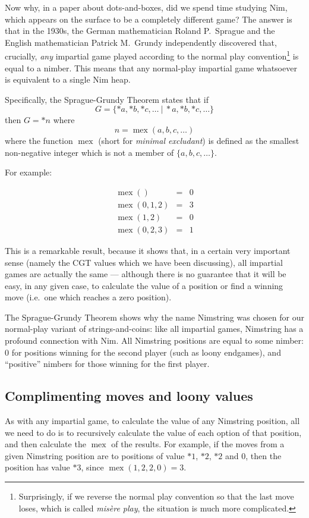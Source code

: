 \documentclass[a4paper,twocolumn]{article}
\DeclareMathOperator{\mex}{mex}
\newcommand{\cgtgame}[2]{\{#1 \:|\: #2\}}
\begin{document}
Now why, in a paper about dots-and-boxes, did we spend time studying
Nim, which appears on the surface to be a completely different game?
The answer is that in the 1930s, the German mathematician Roland
P.\ Sprague and the English mathematician Patrick M.\ Grundy
independently discovered that, crucially, \emph{any} impartial game
played according to the normal play convention\footnote{Surprisingly,
  if we reverse the normal play convention so that the last move
  loses, which is called \emph{mis\`ere play}, the situation is much
  more complicated.} is equal to a nimber. This means that any
normal-play impartial game whatsoever is equivalent to a single Nim
heap.

Specifically, the Sprague-Grundy Theorem states that if $$G =
\cgtgame{*a, *b, *c, \ldots}{*a, *b, *c, \ldots}$$ then $G = *n$
where $$n = \mex(a, b, c, \ldots)$$ where the function $\mex$ (short
for \emph{minimal excludant}) is defined as the smallest non-negative
integer which is not a member of $\{a, b, c, \ldots\}$.

For example:

\begin{eqnarray*}
  \mex() & = & 0 \\
  \mex(0, 1, 2) & = & 3 \\
  \mex(1, 2) & = & 0 \\
  \mex(0, 2, 3) & = & 1
\end{eqnarray*}

This is a remarkable result, because it shows that, in a certain very
important sense (namely the CGT values which we have been discussing),
all impartial games are actually the same --- although there is no
guarantee that it will be easy, in any given case, to calculate the
value of a position or find a winning move (i.e.\ one which reaches a
zero position).

The Sprague-Grundy Theorem shows why the name Nimstring was chosen for
our normal-play variant of strings-and-coins: like all impartial
games, Nimstring has a profound connection with Nim. All Nimstring
positions are equal to some nimber: $0$ for positions winning for the
second player (such as loony endgames), and ``positive'' nimbers for
those winning for the first player.

\subsection{Complimenting moves and loony values}

As with any impartial game, to calculate the value of any Nimstring
position, all we need to do is to recursively calculate the value of
each option of that position, and then calculate the $\mex$ of the
results. For example, if the moves from a given Nimstring position are
to positions of value $*1$, $*2$, $*2$ and $0$, then the position has
value $*3$, since $\mex(1, 2, 2, 0) = 3$.
\end{document}
